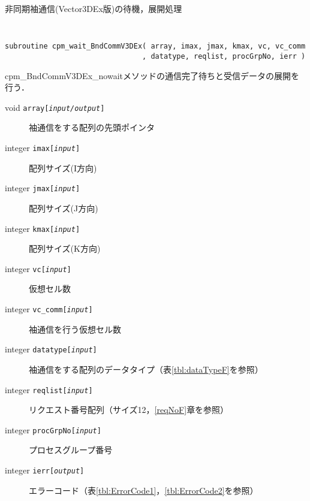 \begin{spacing}{0.8}
\begin{itembox}[l]{非同期袖通信(Vector3DEx版)の待機，展開処理}
{\tt
\begin{verbatim}
subroutine cpm_wait_BndCommV3DEx( array, imax, jmax, kmax, vc, vc_comm
                                , datatype, reqlist, procGrpNo, ierr )
\end{verbatim}
}
cpm\_BndCommV3DEx\_nowaitメソッドの通信完了待ちと受信データの展開を行う．
\begin{description}
\item[void    {\tt array[{\it input/output}]}] 袖通信をする配列の先頭ポインタ
\item[integer {\tt imax[{\it input}]}] 配列サイズ(I方向)
\item[integer {\tt jmax[{\it input}]}] 配列サイズ(J方向)
\item[integer {\tt kmax[{\it input}]}] 配列サイズ(K方向)
\item[integer {\tt vc[{\it input}]}] 仮想セル数
\item[integer {\tt vc\_comm[{\it input}]}] 袖通信を行う仮想セル数
\item[integer {\tt datatype[{\it input}]}] 袖通信をする配列のデータタイプ（表\ref{tbl:dataTypeF}を参照）
\item[integer {\tt reqlist[{\it input}]}] リクエスト番号配列（サイズ12，\ref{reqNoF}章を参照）
\item[integer {\tt procGrpNo[{\it input}]}] プロセスグループ番号
\item[integer {\tt ierr[{\it output}]}] エラーコード（表\ref{tbl:ErrorCode1}，\ref{tbl:ErrorCode2}を参照）
\end{description}
\end{itembox}\\
\end{spacing}


